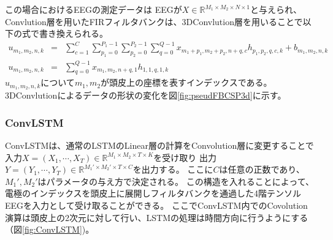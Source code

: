 この場合におけるEEGの測定データは
EEGが\(X\in \mathbb R^{M_1\times M_2\times N\times 1}\)と与えられ、
Convlution層を用いたFIRフィルタバンクは、3DConvlution層を用いることで以下の式で書き換えられる。
\begin{eqnarray}
    u_{m_1,m_2,n,k}& = &\sum_{c=1}^C\sum_{p_1=0}^{P_1-1}\sum_{p_2=0}^{P_2-1}\sum_{q=0}^{Q-1} x_{m_1+p_1,m_2+p_2,n+q,c} h_{p_1,p_2,q,c,k} + b_{m_1,m_2,n,k}\\
    u_{m_1,m_2,n,k}& = &\sum_{q=0}^{Q-1} x_{m_1,m_2,n+q,1} h_{1,1,q,1,k}
    \label{eq:pseudoFIR3D}
\end{eqnarray} 
\(u_{m_1,m_2,n,k}\)について\(m_1,m_2\)が頭皮上の座標を表すインデックスである。
3DConvlutionによるデータの形状の変化を図\ref{fig:pseudFBCSP3d}に示す。


\subsubsection{\rm ConvLSTM}
ConvLSTMは、通常のLSTMのLinear層の計算をConvolution層に変更することで
入力\(X = (X_1,\cdots,X_T)\in \mathbb R^{M_1 \times M_2 \times T \times K}\)を受け取り
出力\(Y = (Y_1,\cdots,Y_T)\in \mathbb R^{M_1' \times M_2' \times T \times C}\)を出力する。
ここに\(C\)は任意の正数であり、\(M_1',M_2'\)はパラメータの与え方で決定される。
この構造を入れることによって、
電極のインデックスを頭皮上に展開しフィルタバンクを通過した4階テンソルEEGを入力として受け取ることができる。
ここでConvLSTM内でのCovolution演算は頭皮上の2次元に対して行い、LSTMの処理は時間方向に行うようにする（図\ref{fig:ConvLSTM})。

